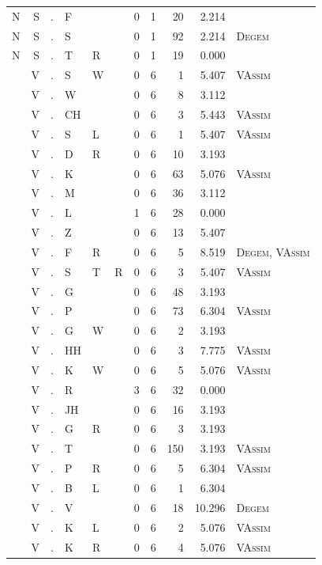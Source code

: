 \documentclass[12pt]{article}
\begin{document}
\begin{longtable}{r@{ } r@{ } c@{ } l@{ } l@{ } l@{ } r r r r l }
N & S & . & F &  &  & 0 & 1 & 20 & 2.214 &  \\
N & S & . & S &  &  & 0 & 1 & 92 & 2.214 & \textsc{Degem} \\
N & S & . & T & R &  & 0 & 1 & 19 & 0.000 &  \\
 & V & . & S & W &  & 0 & 6 & 1 & 5.407 & \textsc{VAssim} \\
 & V & . & W &  &  & 0 & 6 & 8 & 3.112 &  \\
 & V & . & CH &  &  & 0 & 6 & 3 & 5.443 & \textsc{VAssim} \\
 & V & . & S & L &  & 0 & 6 & 1 & 5.407 & \textsc{VAssim} \\
 & V & . & D & R &  & 0 & 6 & 10 & 3.193 &  \\
 & V & . & K &  &  & 0 & 6 & 63 & 5.076 & \textsc{VAssim} \\
 & V & . & M &  &  & 0 & 6 & 36 & 3.112 &  \\
 & V & . & L &  &  & 1 & 6 & 28 & 0.000 &  \\
 & V & . & Z &  &  & 0 & 6 & 13 & 5.407 &  \\
 & V & . & F & R &  & 0 & 6 & 5 & 8.519 & \textsc{Degem}, \textsc{VAssim} \\
 & V & . & S & T & R & 0 & 6 & 3 & 5.407 & \textsc{VAssim} \\
 & V & . & G &  &  & 0 & 6 & 48 & 3.193 &  \\
 & V & . & P &  &  & 0 & 6 & 73 & 6.304 & \textsc{VAssim} \\
 & V & . & G & W &  & 0 & 6 & 2 & 3.193 &  \\
 & V & . & HH &  &  & 0 & 6 & 3 & 7.775 & \textsc{VAssim} \\
 & V & . & K & W &  & 0 & 6 & 5 & 5.076 & \textsc{VAssim} \\
 & V & . & R &  &  & 3 & 6 & 32 & 0.000 &  \\
 & V & . & JH &  &  & 0 & 6 & 16 & 3.193 &  \\
 & V & . & G & R &  & 0 & 6 & 3 & 3.193 &  \\
 & V & . & T &  &  & 0 & 6 & 150 & 3.193 & \textsc{VAssim} \\
 & V & . & P & R &  & 0 & 6 & 5 & 6.304 & \textsc{VAssim} \\
 & V & . & B & L &  & 0 & 6 & 1 & 6.304 &  \\
 & V & . & V &  &  & 0 & 6 & 18 & 10.296 & \textsc{Degem} \\
 & V & . & K & L &  & 0 & 6 & 2 & 5.076 & \textsc{VAssim} \\
 & V & . & K & R &  & 0 & 6 & 4 & 5.076 & \textsc{VAssim} \\

\end{longtable}
\end{document}
